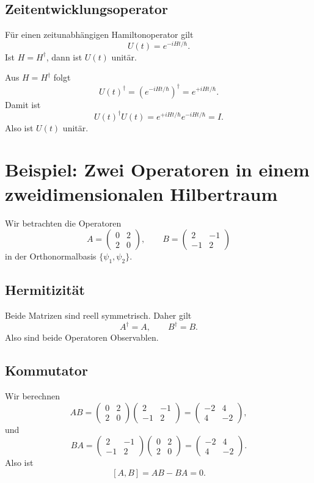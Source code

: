 \subsection{Zeitentwicklungsoperator}

Für einen zeitunabhängigen Hamiltonoperator gilt
\[
    U(t)=e^{-iHt/\hbar}.
\]
Ist $H=H^\dagger$, dann ist $U(t)$ unitär.

\begin{derivationbox}
Aus $H=H^\dagger$ folgt
\[
    U(t)^\dagger=\left(e^{-iHt/\hbar}\right)^\dagger=e^{+iHt/\hbar}.
\]
Damit ist
\[
    U(t)^\dagger U(t)=e^{+iHt/\hbar}e^{-iHt/\hbar}=I.
\]
Also ist $U(t)$ unitär.
\end{derivationbox}

\section{Beispiel: Zwei Operatoren in einem zweidimensionalen Hilbertraum}

Wir betrachten die Operatoren
\[
    A=\begin{pmatrix}0&2\\2&0\end{pmatrix},
    \qquad
    B=\begin{pmatrix}2&-1\\-1&2\end{pmatrix}
\]
in der Orthonormalbasis $\{\psi_1,\psi_2\}$.

\subsection{Hermitizität}

Beide Matrizen sind reell symmetrisch. Daher gilt
\[
    A^\dagger=A,
    \qquad
    B^\dagger=B.
\]
Also sind beide Operatoren Observablen.

\subsection{Kommutator}

Wir berechnen
\[
    AB=\begin{pmatrix}0&2\\2&0\end{pmatrix}
       \begin{pmatrix}2&-1\\-1&2\end{pmatrix}
    =\begin{pmatrix}-2&4\\4&-2\end{pmatrix},
\]
und
\[
    BA=\begin{pmatrix}2&-1\\-1&2\end{pmatrix}
       \begin{pmatrix}0&2\\2&0\end{pmatrix}
    =\begin{pmatrix}-2&4\\4&-2\end{pmatrix}.
\]
Also ist
\[
    [A,B]=AB-BA=0.
\]

